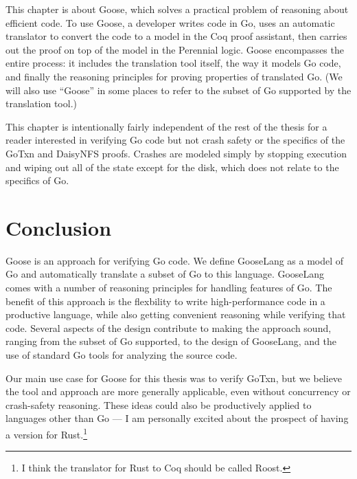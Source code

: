 This chapter is about Goose, which solves a practical
problem of reasoning about efficient code. To use Goose, a developer writes
code in Go, uses an automatic translator to convert the code to a model in the Coq proof
assistant, then carries out the proof on top of the model in the Perennial logic. Goose encompasses
the entire process: it includes the translation tool itself, the way it models Go
code, and finally the reasoning principles for proving properties of translated
Go. (We will also use ``Goose'' in some places to refer to the subset of Go
supported by the translation tool.)

This chapter is intentionally fairly independent of the rest of the thesis for a
reader interested in verifying Go code but not crash safety or the specifics of
the GoTxn and DaisyNFS proofs. Crashes are modeled simply by stopping
execution and wiping out all of the state except for the disk, which does not
relate to the specifics of Go.









\section{Conclusion}

Goose is an approach for verifying Go code. We define GooseLang as a model of Go
and automatically translate a subset of Go to this language. GooseLang comes
with a number of reasoning principles for handling features of Go. The benefit
of this approach is the flexbility to write high-performance code in a
productive language, while also getting convenient reasoning while verifying
that code. Several aspects of the design contribute to making the approach
sound, ranging from the subset of Go supported, to the design of GooseLang, and
the use of standard Go tools for analyzing the source code.

Our main use case for Goose for this thesis was to verify GoTxn, but we believe
the tool and approach are more generally applicable, even without concurrency or
crash-safety reasoning. These ideas could also be productively applied to
languages other than Go --- I am personally excited about the prospect of having
a version for Rust.\footnote{I think the translator for Rust to Coq should be
called Roost.}
